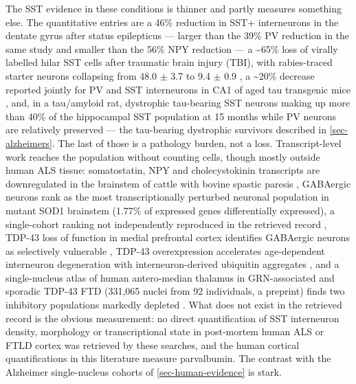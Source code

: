 \documentclass[11pt]{article}
\begin{document}
The SST evidence in these conditions is thinner and partly measures something else. The quantitative entries are a 46\% reduction in SST+ interneurons in the dentate gyrus after status epilepticus --- larger than the 39\% PV reduction in the same study and smaller than the 56\% NPY reduction \citep{Mishra2015} --- a \textasciitilde{}65\% loss of virally labelled hilar SST cells after traumatic brain injury (TBI), with rabies-traced starter neurons collapsing from 48.0 $\pm$ 3.7 to 9.4 $\pm$ 0.9 \citep{Frankowski2022}, a \textasciitilde{}20\% decrease reported jointly for PV and SST interneurons in CA1 of aged tau transgenic mice \citep{Levenga2013}, and, in a tau/amyloid rat, dystrophic tau-bearing SST neurons making up more than 40\% of the hippocampal SST population at 15 months while PV neurons are relatively preserved \citep{Morrone2022} --- the tau-bearing dystrophic survivors described in \ref{sec-alzheimers}. The last of those is a pathology burden, not a loss. Transcript-level work reaches the population without counting cells, though mostly outside human ALS tissue: somatostatin, NPY and cholecystokinin transcripts are downregulated in the brainstem of cattle with bovine spastic paresis \citep{Krull2025}, GABAergic neurons rank as the most transcriptionally perturbed neuronal population in mutant SOD1 brainstem (1.77\% of expressed genes differentially expressed), a single-cohort ranking not independently reproduced in the retrieved record \citep{Liu2020a}, TDP-43 loss of function in medial prefrontal cortex identifies GABAergic neurons as selectively vulnerable \citep{Thapa2025}, TDP-43 overexpression accelerates age-dependent interneuron degeneration with interneuron-derived ubiquitin aggregates \citep{Tsuiji2017}, and a single-nucleus atlas of human antero-median thalamus in GRN-associated and sporadic TDP-43 FTD (331,065 nuclei from 92 individuals, a preprint) finds two inhibitory populations markedly depleted \citep{Trujillo2026}. What does not exist in the retrieved record is the obvious measurement: no direct quantification of SST interneuron density, morphology or transcriptional state in post-mortem human ALS or FTLD cortex was retrieved by these searches, and the human cortical quantifications in this literature measure parvalbumin. The contrast with the Alzheimer single-nucleus cohorts of \ref{sec-human-evidence} is stark.
\end{document}
